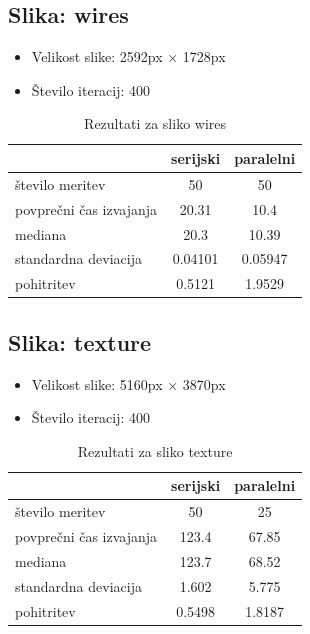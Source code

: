 \documentclass[11pt,a4paper]{article}
\begin{document}
\subsection{Slika: wires}


\begin{itemize}
\item Velikost slike: 2592px × 1728px
\item Število iteracij: 400
\end{itemize}

\begin{table}[htbp]
\begin{center}
\begin{tabular}{|l|c|c|}
	\hline
		& serijski & paralelni  \\
	\hline
	število meritev & 50 & 50\\
	\hline
	povprečni čas izvajanja & 20.31  & 10.4 \\
    \hline
    mediana & 20.3  & 10.39\\
    \hline
    	standardna deviacija & 0.04101  & 0.05947\\
    \hline
    pohitritev & 0.5121 & 1.9529\\
    \hline
\end{tabular}
\end{center}

\caption{Rezultati za sliko wires}
\label{table:ta}
\end{table}

\subsection{Slika: texture}

\begin{itemize}
\item Velikost slike: 5160px × 3870px
\item Število iteracij: 400
\end{itemize}

\begin{table}[htbp]
\begin{center}
\begin{tabular}{|l|c|c|}
	\hline
		& serijski & paralelni  \\
	\hline
	število meritev & 50 & 25 \\
	\hline
	povprečni čas izvajanja & 123.4  & 67.85 \\
    \hline
    mediana  & 123.7 & 68.52\\
    \hline
    	standardna deviacija & 1.602  & 5.775\\
    \hline
    pohitritev & 0.5498 &  1.8187\\
    \hline
\end{tabular}
\end{center}

\caption{Rezultati za sliko texture}
\label{table:ta}
\end{table}
\end{document}
